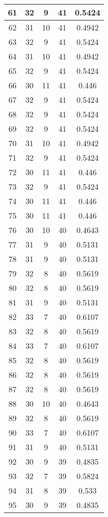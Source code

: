 \documentclass[letterpaper, 12pt]{article}
\begin{document}
\begin{longtable}{|c|c|c|c|c|}
\hline
61 & 32 & 9 & 41 & 0.5424 \\
\hline
62 & 31 & 10 & 41 & 0.4942 \\
\hline
63 & 32 & 9 & 41 & 0.5424 \\
\hline
64 & 31 & 10 & 41 & 0.4942 \\
\hline
65 & 32 & 9 & 41 & 0.5424 \\
\hline
66 & 30 & 11 & 41 & 0.446 \\
\hline
67 & 32 & 9 & 41 & 0.5424 \\
\hline
68 & 32 & 9 & 41 & 0.5424 \\
\hline
69 & 32 & 9 & 41 & 0.5424 \\
\hline
70 & 31 & 10 & 41 & 0.4942 \\
\hline
71 & 32 & 9 & 41 & 0.5424 \\
\hline
72 & 30 & 11 & 41 & 0.446 \\
\hline
73 & 32 & 9 & 41 & 0.5424 \\
\hline
74 & 30 & 11 & 41 & 0.446 \\
\hline
75 & 30 & 11 & 41 & 0.446 \\
\hline
76 & 30 & 10 & 40 & 0.4643 \\
\hline
77 & 31 & 9 & 40 & 0.5131 \\
\hline
78 & 31 & 9 & 40 & 0.5131 \\
\hline
79 & 32 & 8 & 40 & 0.5619 \\
\hline
80 & 32 & 8 & 40 & 0.5619 \\
\hline
81 & 31 & 9 & 40 & 0.5131 \\
\hline
82 & 33 & 7 & 40 & 0.6107 \\
\hline
83 & 32 & 8 & 40 & 0.5619 \\
\hline
84 & 33 & 7 & 40 & 0.6107 \\
\hline
85 & 32 & 8 & 40 & 0.5619 \\
\hline
86 & 32 & 8 & 40 & 0.5619 \\
\hline
87 & 32 & 8 & 40 & 0.5619 \\
\hline
88 & 30 & 10 & 40 & 0.4643 \\
\hline
89 & 32 & 8 & 40 & 0.5619 \\
\hline
90 & 33 & 7 & 40 & 0.6107 \\
\hline
91 & 31 & 9 & 40 & 0.5131 \\
\hline
92 & 30 & 9 & 39 & 0.4835 \\
\hline
93 & 32 & 7 & 39 & 0.5824 \\
\hline
94 & 31 & 8 & 39 & 0.533 \\
\hline
95 & 30 & 9 & 39 & 0.4835 \\

\end{longtable}
\end{document}
